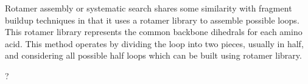 Rotamer assembly or systematic search shares some similarity with fragment buildup techniques in that it uses a rotamer library to assemble possible loops.
This rotamer library represents the common backbone dihedrals for each amino acid.
This method operates by dividing the loop into two pieces, usually in half, and considering all possible half loops which can be built using rotamer library.

\cite{moult1986algorithm}
\cite{kolodny2005inverse}?
